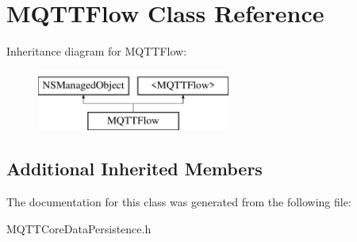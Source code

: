 \hypertarget{interface_m_q_t_t_flow}{}\section{M\+Q\+T\+T\+Flow Class Reference}
\label{interface_m_q_t_t_flow}
Inheritance diagram for M\+Q\+T\+T\+Flow\+:\begin{figure}[H]
\begin{center}
\leavevmode
\includegraphics[height=2.000000cm]{interface_m_q_t_t_flow}
\end{center}
\end{figure}
\subsection*{Additional Inherited Members}


The documentation for this class was generated from the following file\+:\begin{DoxyCompactItemize}
\item 
M\+Q\+T\+T\+Core\+Data\+Persistence.\+h\end{DoxyCompactItemize}
